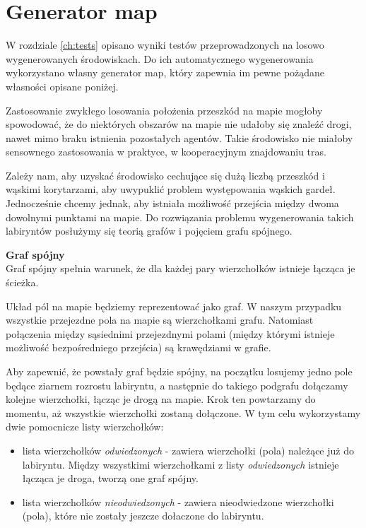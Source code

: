 \section{Generator map}

W rozdziale \ref{ch:tests} opisano wyniki testów przeprowadzonych na losowo wygenerowanych środowiskach.
Do ich automatycznego wygenerowania wykorzystano własny generator map, który zapewnia im pewne pożądane własności opisane poniżej.

Zastosowanie zwykłego losowania położenia przeszkód na mapie mogłoby spowodować, że do niektórych obszarów na mapie nie udałoby się znaleźć drogi, nawet mimo braku istnienia pozostałych agentów. Takie środowisko nie miałoby sensownego zastosowania w praktyce, w kooperacyjnym znajdowaniu tras.

Zależy nam, aby uzyskać środowisko cechujące się dużą liczbą przeszkód i wąskimi korytarzami, aby uwypuklić problem występowania wąskich gardeł. Jednocześnie chcemy jednak, aby istniała możliwość przejścia między dwoma dowolnymi punktami na mapie.
Do rozwiązania problemu wygenerowania takich labiryntów posłużymy się teorią grafów i pojęciem grafu spójnego.

\begin{definition}{\bf Graf spójny\\}
	Graf spójny spełnia warunek, że dla każdej pary wierzchołków istnieje łącząca je ścieżka.
\end{definition}

Układ pól na mapie będziemy reprezentować jako graf.
W naszym przypadku wszystkie przejezdne pola na mapie są wierzchołkami grafu. Natomiast połączenia między sąsiednimi przejezdnymi polami (między którymi istnieje możliwość bezpośredniego przejścia) są krawędziami w grafie.

Aby zapewnić, że powstały graf będzie spójny, na początku losujemy jedno pole będące ziarnem rozrostu labiryntu, a następnie do takiego podgrafu dołączamy kolejne wierzchołki, łącząc je drogą na mapie. Krok ten powtarzamy do momentu, aż wszystkie wierzchołki zostaną dołączone.
W tym celu wykorzystamy dwie pomocnicze listy wierzchołków:
\begin{itemize}
	\item lista wierzchołków {\it odwiedzonych} - zawiera wierzchołki (pola) należące już do labiryntu. Między wszystkimi wierzchołkami z listy {\it odwiedzonych} istnieje łącząca je droga, tworzą one graf spójny.
	\item lista wierzchołków {\it nieodwiedzonych} - zawiera nieodwiedzone wierzchołki (pola), które nie zostały jeszcze dołaczone do labiryntu.
\end{itemize}

